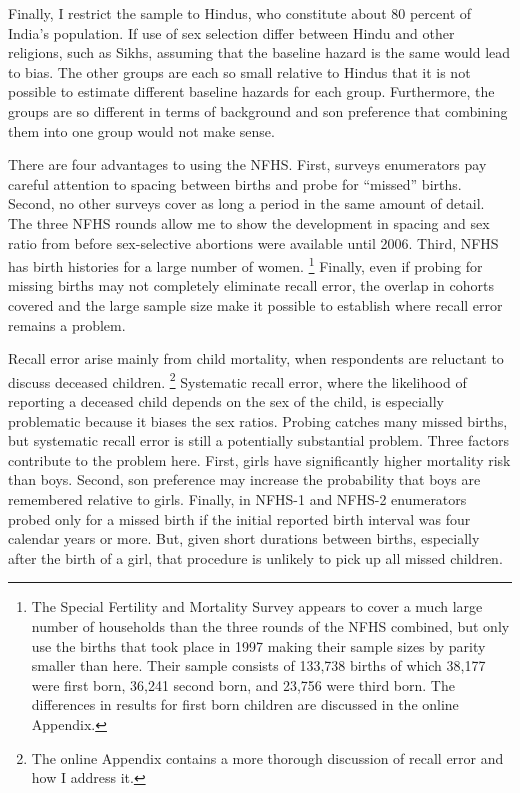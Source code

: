 \documentclass[12pt,letterpaper]{article}
\begin{document}
Finally, I restrict the sample to Hindus,
who constitute about 80 percent of India's population.
If use of sex selection differ between Hindu and other religions, such 
as Sikhs, assuming that the baseline hazard is the same would lead to bias.
The other groups are each so small relative to Hindus that it is not
possible to estimate different baseline hazards for each group.
Furthermore, the groups are so different in terms of background and son preference
that combining them into one group would not make sense.

There are four advantages to using the NFHS.
First, surveys enumerators pay careful attention to spacing between births and
probe for ``missed'' births.
Second, no other surveys cover as long a period in the same amount of detail.
The three NFHS rounds allow me to show the development in spacing and 
sex ratio from before sex-selective abortions were available until 2006.
Third, NFHS has birth histories for a large number of women.%
\footnote{
The Special Fertility and Mortality Survey appears to cover a much large number of households
than the three rounds of the NFHS combined, but \citet{jha06} only use the births that 
took place in 1997 making their sample sizes by parity smaller than here.
Their sample consists of 133,738 births of which 38,177 were first
born, 36,241 second born, and 23,756 were third born.
The differences in results for first born children are discussed in the online 
Appendix.
}
Finally, even if probing for missing births may not completely eliminate recall error,   
the overlap in cohorts covered and the large sample size make it possible to establish 
where recall error remains a problem.

Recall error arise mainly from child mortality, when respondents are reluctant to
discuss deceased children.%
\footnote{
The online Appendix contains a more thorough discussion of recall error and how I address it.
} 
Systematic recall error, where the likelihood of reporting a deceased child depends on
the sex of the child, is especially problematic because it biases the sex ratios.
Probing catches many missed births, but systematic recall error is still a potentially 
substantial problem.
Three factors contribute to the problem here.
First, girls have significantly higher mortality risk than boys.
Second, son preference may increase the probability that boys are remembered relative to girls.
Finally, in NFHS-1 and NFHS-2 enumerators probed only for a missed birth if the
initial reported birth interval was four calendar years or more.
But, given short durations between births, especially after the birth of a girl,
that procedure is unlikely to pick up all missed children.
\end{document}
